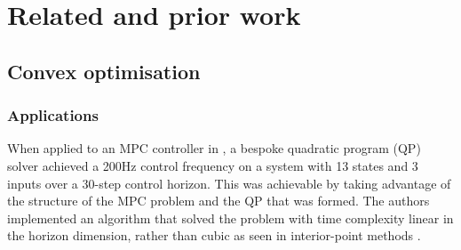 \chapter{Related and prior work}

\section{Convex optimisation}

\subsection{Applications}

When applied to an MPC controller in \cite{Wang10}, a bespoke quadratic program
(QP) solver achieved a 200Hz control frequency on a system with 13 states and 3
inputs over a 30-step control horizon. This was achievable by taking advantage
of the structure of the MPC problem and the QP that was formed. The authors
implemented an algorithm that solved the problem with time complexity linear in
the horizon dimension, rather than cubic as seen in interior-point methods
\cite{}.
